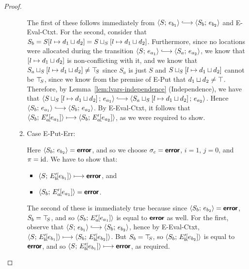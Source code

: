 \begin{proof}
\begin{enumerate}
\begin{enumerate}
      The first of these follows immediately from $\config{S}{e_{b_1}}
      \parstepsto \config{S_b}{e_{b_2}}$ and {\sc E-Eval-Ctxt}.  For
      the second, consider that $S_b =
      S[l \mapsto d_1 \sqcup d_2] =
      S \sqcup_{S} \left[ l \mapsto d_1 \sqcup d_2 \right]$.
      Furthermore, since no locations were allocated during the transition
      $\config{S}{e_{a_1}} \parstepsto \config{S_a}{e_{a_2}}$, we know
      that $\left[ l \mapsto d_1 \sqcup d_2 \right]$ is
      non-conflicting with it, and we know that
      $S_a \sqcup_{S} \left[ l \mapsto d_1 \sqcup d_2 \right]
      \neq \top\hspace{-0.85mm}_{S}$ since $S_a$ is just $S$ and
      $S \sqcup_{S} \left[ l \mapsto d_1 \sqcup d_2 \right]$
      cannot be $\top\hspace{-0.85mm}_{S}$, since we know from the premise of {\sc E-Put}
      that $d_1 \sqcup d_2 \neq \top$.  Therefore, by
      Lemma~\ref{lem:lvars-independence} (Independence), we have that
      $\config{\lubstore{S}{\store{\storebindingRaw{l}{\userlub{d_1}{d_2}}}}}{e_{a_1}}
      \parstepsto
      \config{\lubstore{S_a}{\store{\storebindingRaw{l}{\userlub{d_1}{d_2}}}}}{e_{a_2}}$.
      Hence $\config{S_b}{e_{a_1}} \parstepsto \config{S_b}{e_{a_2}}$.
      By {\sc E-Eval-Ctxt}, it follows that
      $\langle S_b;\, E'_a\hspace{-1mm}\left[e_{a_1}\right] \rangle \longmapsto
      \langle S_b;\, E'_a\hspace{-1mm}\left[e_{a_2}\right] \rangle$, as we were required to
      show.

    \item \label{lvars-slc-beta-put-err}Case {\sc E-Put-Err}:

      Here $\langle S_b;\, e_{b_2} \rangle = \textbf{\textsf{error}}$, and so we choose $\sigma_c
      = \textbf{\textsf{error}}$, $i = 1$, $j = 0$, and $\pi = \mathrm{id}$.  We have to show that:
      \begin{itemize}
      \item $\langle S;\, E'_b\hspace{-1mm}\left[e_{b_1}\right] \rangle \longmapsto \textbf{\textsf{error}}$,
        and
      \item
        $\langle S_b;\, E'_a\hspace{-1mm}\left[e_{a_1}\right] \rangle = \textbf{\textsf{error}}$.
      \end{itemize}

      The second of these is immediately true because since
      $\langle S_b;\, e_{b_2} \rangle = \textbf{\textsf{error}}$, $S_b = \top\hspace{-0.85mm}_{S}$, and so
      $\langle S_b;\, E'_a\hspace{-1mm}\left[e_{a_1}\right] \rangle$ is equal to $\textbf{\textsf{error}}$ as
      well.  For the first, observe that $\config{S}{e_{b_1}}
      \parstepsto \config{S_b}{e_{b_2}}$, hence by {\sc E-Eval-Ctxt},
      $\langle S;\, E'_b\hspace{-1mm}\left[e_{b_1}\right] \rangle \longmapsto
      \langle S_b;\, E'_b\hspace{-1mm}\left[e_{b_2}\right] \rangle$.  But $S_b = \top\hspace{-0.85mm}_{S}$, so
      $\langle S_b;\, E'_b\hspace{-1mm}\left[e_{b_2}\right] \rangle$ is equal to $\textbf{\textsf{error}}$,
      and so $\langle S;\, E'_b\hspace{-1mm}\left[e_{b_1}\right] \rangle \longmapsto
      \textbf{\textsf{error}}$, as required.


\end{enumerate}
\end{enumerate}
\end{proof}
